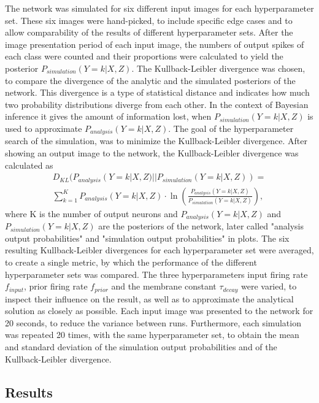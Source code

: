 The network was simulated for six different input images for each hyperparameter set. These six images were hand-picked, to include specific edge cases and to allow comparability of the results of different hyperparameter sets. After the image presentation period of each input image, the numbers of output spikes of each class were counted and their proportions were calculated to yield the posterior $P_{simulation}(Y = k|X, Z)$. The Kullback-Leibler divergence was chosen, to compare the divergence of the analytic and the simulated posteriors of the network. This divergence is a type of statistical distance and indicates how much two probability distributions diverge from each other. In the context of Bayesian inference it gives the amount of information lost, when $P_{simulation}(Y = k|X, Z)$ is used to approximate $P_{analysis}(Y = k|X, Z)$. The goal of the hyperparameter search of the simulation, was to minimize the Kullback-Leibler divergence. After showing an output image to the network, the Kullback-Leibler divergence was calculated as
\begin{equation}
\begin{split}
\label{eqn:KLDivergence}
D_{KL}(P_{analysis}(Y = k|X, Z)||P_{simulation}(Y = k|X, Z)) = \\ \sum_{k=1}^K P_{analysis}(Y = k|X, Z) \cdot \ln( \frac{P_{analysis}(Y = k|X, Z)}{P_{simulation}(Y = k|X, Z)}),
\end{split}
\end{equation}
where K is the number of output neurons and $P_{analysis}(Y = k|X, Z)$ and $P_{simulation}(Y = k|X, Z)$ are the posteriors of the network, later called "analysis output probabilities" and "simulation output probabilities" in plots. The six resulting Kullback-Leibler divergences for each hyperparameter set were  averaged, to create a single metric, by which the performance of the different hyperparameter sets was compared. The three hyperparameters input firing rate $f_{input}$, prior firing rate $f_{prior}$ and the membrane constant $\tau_{decay}$ were varied, to inspect their influence on the result, as well as to approximate the analytical solution as closely as possible. Each input image was presented to the network for 20 seconds, to reduce the variance between runs. Furthermore, each simulation was repeated 20 times, with the same hyperparameter set, to obtain the mean and standard deviation of the simulation output probabilities and of the Kullback-Leibler divergence.

\subsection{Results}

